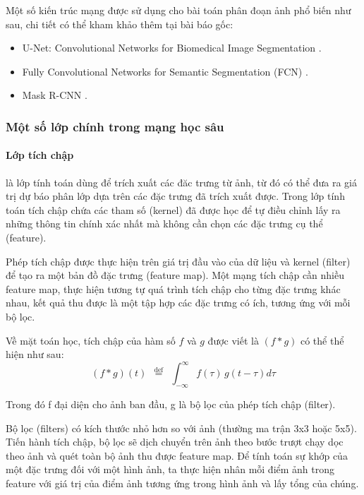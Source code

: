 Một số kiến trúc mạng được sử dụng cho bài toán phân đoạn ảnh phổ biến như sau, chi tiết có thể kham khảo thêm tại bài báo gốc: 
\vspace{-0.5cm}
\begin{itemize}
    \item U-Net: Convolutional Networks for Biomedical Image Segmentation \cite{Unet}.
	\item Fully Convolutional Networks for Semantic Segmentation (FCN) \cite{FCN}.
	\item Mask R-CNN \cite{RCNN}.
\end{itemize}

\subsubsection{Một số lớp chính trong mạng học sâu}
\paragraph{Lớp tích chập}là lớp tính toán dùng để trích xuất các đăc trưng từ ảnh, từ đó có thể đưa ra giá trị dự báo phân lớp dựa trên các đặc trưng đã trích xuất được. Trong lớp tính toán tích chập chứa các tham số (kernel) đã được học để tự điều chỉnh lấy ra những thông tin chính xác nhất mà không cần chọn các đặc trưng cụ thể (feature).\par

Phép tích chập được thực hiện trên giá trị đầu vào của dữ liệu và kernel (filter) để tạo ra một bản đồ đặc trưng (feature map). Một mạng tích chập cần nhiều feature map, thực hiện tương tự quá trình tích chập cho từng đặc trưng khác nhau, kết quả thu được là một tập hợp các đặc trưng có ích, tương ứng với mỗi bộ lọc.\par

Về mặt toán học, tích chập của hàm số $f$ và $g$ được viết là $ (f\ast g)$ có thể thể hiện như sau:
\begin{equation}
	{(f*g)(t)\ \ } {\stackrel {\mathrm {def} }{=}} {\ \ \int_{-\infty }^{\infty }f(\tau )\,g(t-\tau ) d\tau}
\end{equation}

Trong đó f đại diện cho ảnh ban đầu, g là bộ lọc của phép tích chập (filter).

Bộ lọc (filters) có kích thước nhỏ hơn so với ảnh (thường ma trận 3x3 hoặc 5x5). Tiến hành tích chập, bộ lọc sẽ dịch chuyển trên ảnh theo bước trượt chạy dọc theo ảnh và quét toàn bộ ảnh thu được feature map. Để tính toán sự khớp của một đặc trưng đối với một hình ảnh, ta thực hiện nhân mỗi điểm ảnh trong feature với giá trị của điểm ảnh tương ứng trong hình ảnh và lấy tổng của chúng.

